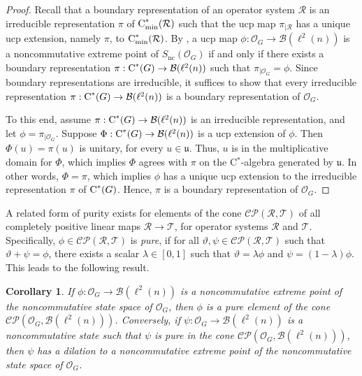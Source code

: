 \documentclass{amsart}
\newtheorem{corollary}[theorem]{Corollary}
\theoremstyle{definition}
\theoremstyle{remark}
\newcommand{\B}{\mathcal{B}}
\newcommand\osr{{\mathcal R}}
\newcommand\ost{{\mathcal T}}
\newcommand\cstar{{\textrm C}^*}                              %
\newcommand\cstare{{\textrm C}_{\textrm{min}}^*}              %
\numberwithin{equation}{section}
\begin{document}
\begin{proof} Recall that a boundary representation of an operator system $\osr$ is an irreducible representation $\pi$ of $\cstare(\osr)$ 
such that the ucp map $\pi_{\vert\osr}$ has a unique ucp extension, namely $\pi$, to $\cstare(\osr)$.
By \cite[Corollary 6.2.1]{davidson--kennedy2019}, a ucp map
$\phi:\mathcal O_G\rightarrow \B(\ell^2(n))$ is a noncommutative extreme point of
$S_{\textrm{nc}}(\mathcal O_G)$ if and only if there exists a boundary representation 
$\pi:\cstar(G)\rightarrow \B(\ell^2(n))$ such that $\pi_{\vert \mathcal O_G}=\phi$. 
Since boundary representations are irreducible, it suffices to show that every 
irreducible representation $\pi:\cstar(G)\rightarrow \B(\ell^2(n))$ is a boundary representation of $\mathcal O_G$.

To this end, assume $\pi:\cstar(G)\rightarrow \B(\ell^2(n))$ is an irreducible representation, and let $\phi=\pi_{\vert \mathcal O_G}$. 
Suppose $\Phi:\cstar(G)\rightarrow \B(\ell^2(n))$ is a ucp extension of $\phi$. Then $\Phi(u)=\pi(u)$ is unitary, for every $u\in\mathfrak u$.
Thus, $u$ is in the multiplicative domain for $\Phi$, which implies $\Phi$ agrees with $\pi$ on the C$^*$-algebra generated by $\mathfrak u$.
In other words, $\Phi=\pi$, which implies $\phi$ has a unique ucp extension to the irreducible representation $\pi$ of $\cstar(G)$. Hence,
$\pi$ is a boundary representation of $\mathcal O_G$.
\end{proof}


A related form of purity exists for elements of the cone $\mathcal C \mathcal P(\osr,\ost)$ of all completely positive linear maps $\osr\rightarrow\ost$,
for operator systems $\osr$ and $\ost$. Specifically, $\phi\in \mathcal C \mathcal P(\osr,\ost)$ is \emph{pure}, if for all $\vartheta,\psi\in \mathcal C \mathcal P(\osr,\ost)$
such that $\vartheta+\psi=\phi$, there exists a scalar $\lambda\in[0,1]$ such that $\vartheta=\lambda\phi$ and $\psi=(1-\lambda)\phi$. This leads to the following
result.

\begin{corollary} If $\phi:\mathcal O_G\rightarrow\B(\ell^2(n))$ is a noncommutative extreme point of the noncommutative state space of $\mathcal O_G$,
then  $\phi$ is a pure element of the cone $\mathcal C \mathcal P(\mathcal O_G,\B(\ell^2(n)))$. Conversely, if 
$\psi:\mathcal O_G\rightarrow\B(\ell^2(n))$ is a noncommutative state such that $\psi$ is pure in the cone $\mathcal C \mathcal P(\mathcal O_G,\B(\ell^2(n)))$,
then $\psi$ has a dilation to a noncommutative extreme point of the noncommutative state space of $\mathcal O_G$.
\end{corollary}
\end{document}
